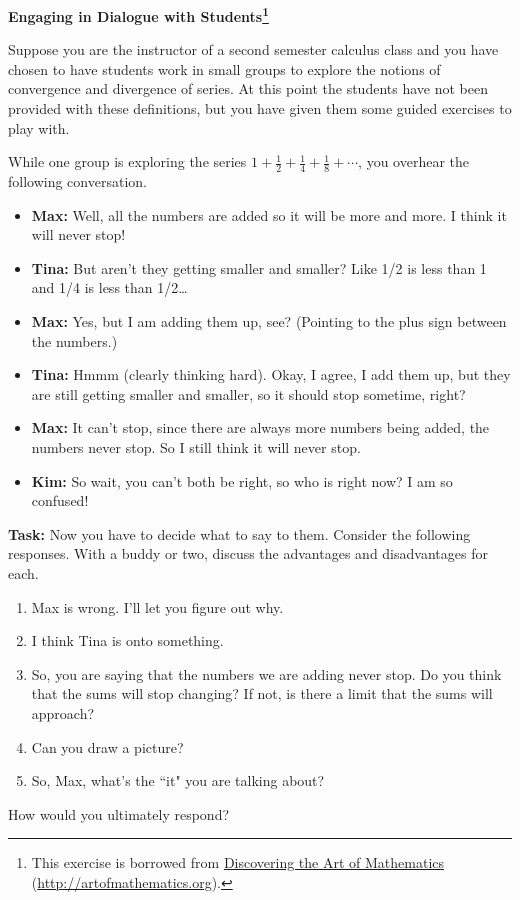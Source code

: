 \documentclass[12pt]{article}
\newcommand{\blankline}{\pagebreak[2]\vspace{.5\baselineskip}}
\begin{document}
\begin{center}

{\Large\bf Engaging in Dialogue with Students\footnote{This exercise is borrowed from \href{http://www.artofmathematics.org/}{Discovering the Art of Mathematics} (\url{http://artofmathematics.org}).}} 

\end{center}

\setlength{\parindent}{0pt}
\setlength{\fboxsep}{10pt}

Suppose you are the instructor of a second semester calculus class and you have chosen to have students work in small groups to explore the notions of convergence and divergence of series.  At this point the students have not been provided with these definitions, but you have given them some guided exercises to play with.

\blankline

While one group is exploring the series $1+\frac{1}{2}+\frac{1}{4}+\frac{1}{8}+\cdots$, you overhear the following conversation.

\begin{itemize}
\item[] \textbf{Max:} Well, all the numbers are added so it will be more and more. I think it will never stop!
\item[] \textbf{Tina:} But aren't they getting smaller and smaller? Like 1/2 is less than 1 and 1/4 is less than 1/2\ldots
\item[] \textbf{Max:} Yes, but I am adding them up, see? (Pointing to the plus sign between the numbers.)
\item[] \textbf{Tina:} Hmmm (clearly thinking hard). Okay, I agree, I add them up, but they are still getting smaller and smaller, so it should stop sometime, right?
\item[] \textbf{Max:} It can't stop, since there are always more numbers being added, the numbers never stop. So I still think it will never stop.
\item[] \textbf{Kim:} So wait, you can't both be right, so who is right now? I am so confused!
\end{itemize}

\textbf{Task:}  Now you have to decide what to say to them.  Consider the following responses.  With a buddy or two, discuss the advantages and disadvantages for each.

\begin{enumerate}
\item Max is wrong.  I'll let you figure out why.
\item I think Tina is onto something.
\item So, you are saying that the numbers we are adding never stop.  Do you think that the sums will stop changing?  If not, is there a limit that the sums will approach?
\item Can you draw a picture?
\item So, Max, what's the ``it" you are talking about?
\end{enumerate}

How would you ultimately respond?
\end{document}
